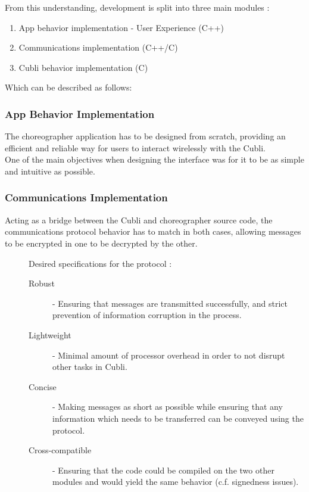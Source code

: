 From this understanding, development is split into three main modules :

\begin{enumerate}
\item App behavior implementation - User Experience (C++)  
\item Communications implementation  (C++/C)
\item Cubli behavior implementation  (C)  
\end{enumerate}
 
Which can be described as follows:

\subsubsection{App Behavior Implementation}

The choreographer application has to be designed from scratch, providing an efficient and reliable way for users to interact wirelessly with the Cubli. \\

One of the main objectives when designing the interface was for it to be as simple and intuitive as possible.
 
\subsubsection{Communications Implementation}

Acting as a bridge between the Cubli and choreographer source code, the communications protocol behavior has to match in both cases, allowing messages to be encrypted in one to be decrypted by the other.

\begin{description}
\item[] Desired specifications for the protocol :
\begin{description}
  \item[Robust] - Ensuring that messages are transmitted successfully, and    strict prevention of information corruption in the process. 

  \item[Lightweight] - Minimal amount of processor overhead in order to not disrupt other tasks in Cubli.

  \item[Concise] - Making messages as short as possible while ensuring that 	any information which needs to be transferred can be conveyed using the 	protocol. 

  \item[Cross-compatible] - Ensuring that the code could be compiled on the 	two other modules and would yield the same behavior (c.f. signedness 	issues).
\end{description}
\end{description}
 
